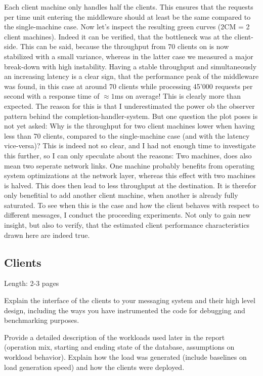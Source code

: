 \documentclass[11pt]{article}
\begin{document}
Each client machine only handles half the clients. This ensures that the requests per time unit entering the middleware should at least be the same compared to the single-machine case. Now let's inspect the resulting green curves (2CM = 2 client machines). Indeed it can be verified, that the bottleneck was at the client-side. This can be said, because the throughput from 70 clients on is now stabilized with a small variance, whereas in the latter case we measured a major break-down with high instability. Having a stable throughput and simultaneously an increasing latency is a clear sign, that the performance peak of the middleware was found, in this case at around 70 clients while processing 45'000 requests per second with a response time of $\approx1$ms on average! This is clearly more than expected. The reason for this is that I underestimated the power ob the observer pattern behind the completion-handler-system. But one question the plot poses is not yet asked: Why is the throughput for two client machines lower when having less than 70 clients, compared to the single-machine case (and with the latency vice-versa)? This is indeed not so clear, and I had not enough time to investigate this further, so I can only speculate about the reasons: Two machines, does also mean two seperate network links. One machine probably benefits from operating system optimizations at the network layer, whereas this effect with two machines is halved. This does then lead to less throughput at the destination. It is therefor only benefitial to add another client machine, when another is already fully saturated. To see when this is the case and how the client behaves with respect to different messages, I conduct the proceeding experiments. Not only to gain new insight, but also to verify, that the estimated client performance characteristics drawn here are indeed true.

\subsection{Clients}\label{sec:clients}

Length: 2-3 pages

Explain the interface of the clients to your messaging system and their
high level design, including the ways you have instrumented the code for
debugging and benchmarking purposes.

Provide a detailed description of the workloads used later in the report
(operation mix, starting and ending state of the database, assumptions
on workload behavior). Explain how the load was generated (include
baselines on load generation speed) and how the clients were deployed.
\end{document}
